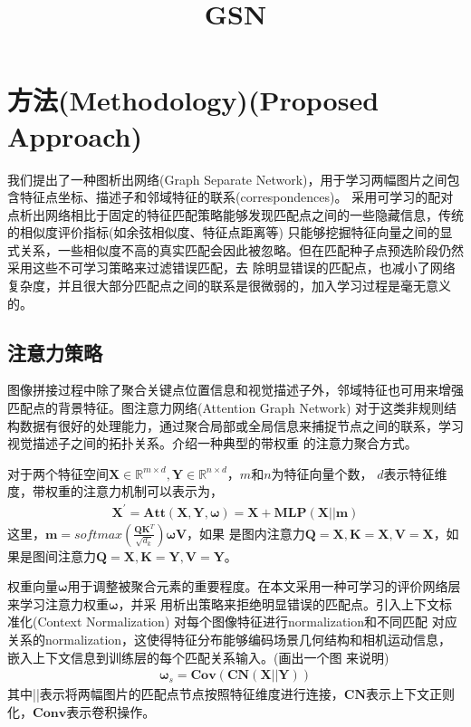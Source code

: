 \documentclass[10pt]{article}
\title{\textbf{GSN}}
\date{}
\begin{document}
\maketitle
\setcounter{page}{0}
\maketitle
\section{方法(Methodology)(Proposed Approach)}
我们提出了一种图析出网络(Graph Separate Network)，用于学习两幅图片之间包含特征点坐标、描述子和邻域特征的联系(correspondences)。
采用可学习的配对点析出网络相比于固定的特征匹配策略能够发现匹配点之间的一些隐藏信息，传统的相似度评价指标(如余弦相似度、特征点距离等)
只能够挖掘特征向量之间的显式关系，一些相似度不高的真实匹配会因此被忽略。但在匹配种子点预选阶段仍然采用这些不可学习策略来过滤错误匹配，去
除明显错误的匹配点，也减小了网络复杂度，并且很大部分匹配点之间的联系是很微弱的，加入学习过程是毫无意义的。 
\subsection{注意力策略} 
图像拼接过程中除了聚合关键点位置信息和视觉描述子外，邻域特征也可用来增强匹配点的背景特征。图注意力网络(Attention Graph Network)
对于这类非规则结构数据有很好的处理能力，通过聚合局部或全局信息来捕捉节点之间的联系，学习视觉描述子之间的拓扑关系。介绍一种典型的带权重
的注意力聚合方式。\cite{Sattler2018}

对于两个特征空间$\mathbf{X}\in \mathbb{R}^{m \times d},\mathbf{Y}\in \mathbb{R}^{n \times d}$，$m$和$n$为特征向量个数，
$d$表示特征维度，带权重的注意力机制可以表示为，
\begin{align} 
    \mathbf{X}^{'} = \mathbf{Att}(\mathbf{X},\mathbf{Y},\mathbf{\omega})=\mathbf{X}+\mathbf{MLP}(\mathbf{X}||\mathbf{m})
\end{align}
这里，$\mathbf{m}=softmax(\frac{\mathbf{Q}\mathbf{K}^T}{\sqrt{d_k}})\mathbf{\omega}\mathbf{V}$\cite{Vaswani2017}，如果
是图内注意力$\mathbf{Q}=\mathbf{X},\mathbf{K}=\mathbf{X},\mathbf{V}=\mathbf{X}$，如果是图间注意力$\mathbf{Q}=\mathbf{X},
\mathbf{K}=\mathbf{Y},\mathbf{V}=\mathbf{Y}$。

权重向量$\mathbf{\omega}$用于调整被聚合元素的重要程度。在本文采用一种可学习的评价网络层来学习注意力权重$\mathbf{\omega}$，并采
用析出策略来拒绝明显错误的匹配点。引入上下文标准化(Context Normalization)\cite{Yi2017}
对每个图像特征进行normalization和不同匹配
对应关系的normalization，这使得特征分布能够编码场景几何结构和相机运动信息，嵌入上下文信息到训练层的每个匹配关系输入。(画出一个图
来说明)
\begin{align} 
    \mathbf{\omega}_{s}=\mathbf{Cov}(\mathbf{CN}(\mathbf{X}||\mathbf{Y}))
\end{align}
其中||表示将两幅图片的匹配点节点按照特征维度进行连接，$\mathbf{CN}$表示上下文正则化，$\mathbf{Conv}$表示卷积操作。 
\end{document}
